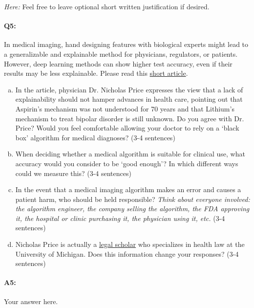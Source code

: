 \emph{Here:} Feel free to leave optional short written justification if desired.


\pagebreak
\paragraph{Q5:}
In medical imaging, hand designing features with biological experts might lead to a generalizable and explainable method for physicians, regulators, or patients. However, deep learning methods can show higher test accuracy, even if their results may be less explainable.
Please read this \href{https://drive.google.com/file/d/16CztlicOOTImvP9ZrtTUNKwLuv6srOBW/view?usp=sharing}{short article}.

\begin{enumerate}[(a)]
    \item
    In the article, physician Dr. Nicholas Price expresses the view that a lack of explainability should not hamper advances in health care, pointing out that Aspirin’s mechanism was not understood for 70 years and that Lithium’s mechanism to treat bipolar disorder is still unknown. Do you agree with Dr. Price? Would you feel comfortable allowing your doctor to rely on a ‘black box’ algorithm for medical diagnoses? (3-4 sentences)
    \item
    When deciding whether a medical algorithm is suitable for clinical use, what accuracy would you consider to be ‘good enough’? In which different ways could we measure this? (3-4 sentences)
    \item
    In the event that a medical imaging algorithm makes an error and causes a patient harm, who should be held responsible? \textit{Think about everyone involved: the algorithm engineer, the company selling the algorithm, the FDA approving it, the hospital or clinic purchasing it, the physician using it, etc.} (3-4 sentences)
    \item
    Nicholas Price is actually a \href{https://drive.google.com/file/d/1bDAqEtW482OJeqMBt5A4AradVa4gf_o9/view}{legal scholar} who specializes in health law at the University of Michigan. Does this information change your responses? (3-4 sentences)

\end{enumerate}

\paragraph{A5:} Your answer here.

